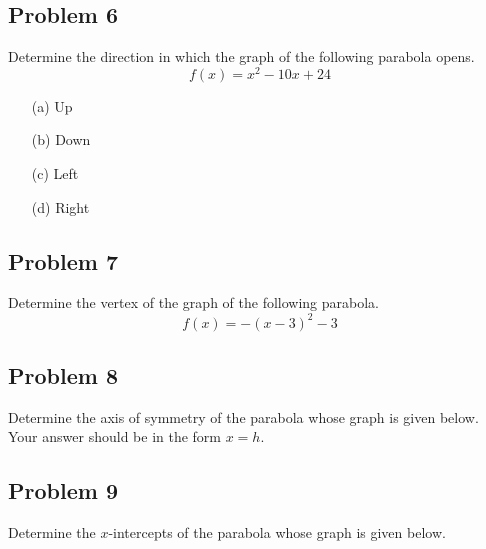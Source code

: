\documentclass[12pt]{article}
\begin{document}
\subsection*{Problem 6}
Determine the direction in which the graph of the following parabola opens.
\[f(x)=x^2-10x+24\]
\begin{enumerate}
    \item[(a)] Up
    \item[(b)] Down
    \item[(c)] Left
    \item[(d)] Right
\end{enumerate}

\subsection*{Problem 7}
Determine the vertex of the graph of the following parabola.
\[f(x)=-(x-3)^2-3\]

\subsection*{Problem 8}
Determine the axis of symmetry of the parabola whose graph is given below. Your answer should be in the form \(x=h\).

\begin{center}
\end{center}

\subsection*{Problem 9}
Determine the \(x\)-intercepts of the parabola whose graph is given below.

\begin{center}
\end{center}
\end{document}
